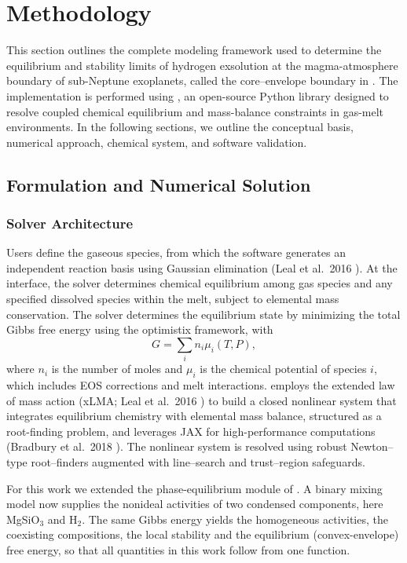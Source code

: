 \chapter{Methodology}\label{ch:methodology}

This section outlines the complete modeling framework used to determine the equilibrium and
stability limits of hydrogen exsolution at the magma-atmosphere boundary of sub-Neptune
exoplanets, called the core--envelope boundary in \cite{gilmore2026}. The implementation is
performed using \Atm{} \cite{bower2025}, an open-source Python library designed to resolve
coupled chemical equilibrium and mass-balance constraints in gas-melt environments. In the
following sections, we outline the conceptual basis, numerical approach, chemical system,
and software validation.

\section{Formulation and Numerical Solution}

\subsection{Solver Architecture}

Users define the gaseous species, from which the software generates an independent reaction
basis using Gaussian elimination (Leal et al.\ 2016 \cite{leal2016}). At the interface, the
solver determines chemical equilibrium among gas species and any specified dissolved species
within the melt, subject to elemental mass conservation. The solver determines the
equilibrium state by minimizing the total Gibbs free energy using the optimistix framework,
with
\begin{equation}
G = \sum_i n_i \mu_i(T,P),
\label{eq:gibbs}
\end{equation}
where $n_i$ is the number of moles and $\mu_i$ is the chemical potential of species $i$,
which includes EOS corrections and melt interactions. \Atm{} employs the extended law of mass
action (xLMA; Leal et al.\ 2016 \cite{leal2016}) to build a closed nonlinear system that
integrates equilibrium chemistry with elemental mass balance, structured as a root-finding
problem, and leverages JAX for high-performance computations (Bradbury et al.\ 2018
\cite{jax2018}). The nonlinear system is resolved using robust Newton--type root--finders
augmented with line--search and trust--region safeguards.

For this work we extended the phase-equilibrium module of \Atm{}. A binary mixing model now
supplies the nonideal activities of two condensed components, here MgSiO$_3$ and H$_2$. The
same Gibbs energy yields the homogeneous activities, the coexisting compositions, the local
stability and the equilibrium (convex-envelope) free energy, so that all quantities in this
work follow from one function.

